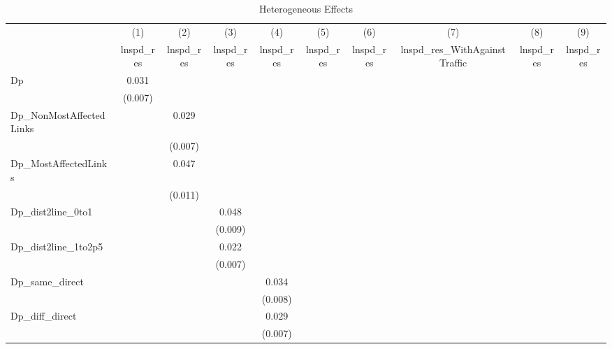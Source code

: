 \begin{table}[htbp]\centering \caption{Heterogeneous Effects} \begin{tabular}{l*{9}{c}} \hline\hline
            &\multicolumn{1}{c}{(1)}&\multicolumn{1}{c}{(2)}&\multicolumn{1}{c}{(3)}&\multicolumn{1}{c}{(4)}&\multicolumn{1}{c}{(5)}&\multicolumn{1}{c}{(6)}&\multicolumn{1}{c}{(7)}&\multicolumn{1}{c}{(8)}&\multicolumn{1}{c}{(9)}\\
            &\multicolumn{1}{c}{lnspd\_res}&\multicolumn{1}{c}{lnspd\_res}&\multicolumn{1}{c}{lnspd\_res}&\multicolumn{1}{c}{lnspd\_res}&\multicolumn{1}{c}{lnspd\_res}&\multicolumn{1}{c}{lnspd\_res}&\multicolumn{1}{c}{lnspd\_res\_WithAgainstTraffic}&\multicolumn{1}{c}{lnspd\_res}&\multicolumn{1}{c}{lnspd\_res}\\
\hline
Dp          &  0.031&       &       &       &       &       &       &       &       \\
            &(0.007)&       &       &       &       &       &       &       &       \\
[1em]
Dp\_NonMostAffectedLinks&       &  0.029&       &       &       &       &       &       &       \\
            &       &(0.007)&       &       &       &       &       &       &       \\
[1em]
Dp\_MostAffectedLinks&       &  0.047&       &       &       &       &       &       &       \\
            &       &(0.011)&       &       &       &       &       &       &       \\
[1em]
Dp\_dist2line\_0to1&       &       &  0.048&       &       &       &       &       &       \\
            &       &       &(0.009)&       &       &       &       &       &       \\
[1em]
Dp\_dist2line\_1to2p5&       &       &  0.022&       &       &       &       &       &       \\
            &       &       &(0.007)&       &       &       &       &       &       \\
[1em]
Dp\_same\_direct&       &       &       &  0.034&       &       &       &       &       \\
            &       &       &       &(0.008)&       &       &       &       &       \\
[1em]
Dp\_diff\_direct&       &       &       &  0.029&       &       &       &       &       \\
            &       &       &       &(0.007)&       &       &       &       &       \\

\end{tabular}
\end{table}
